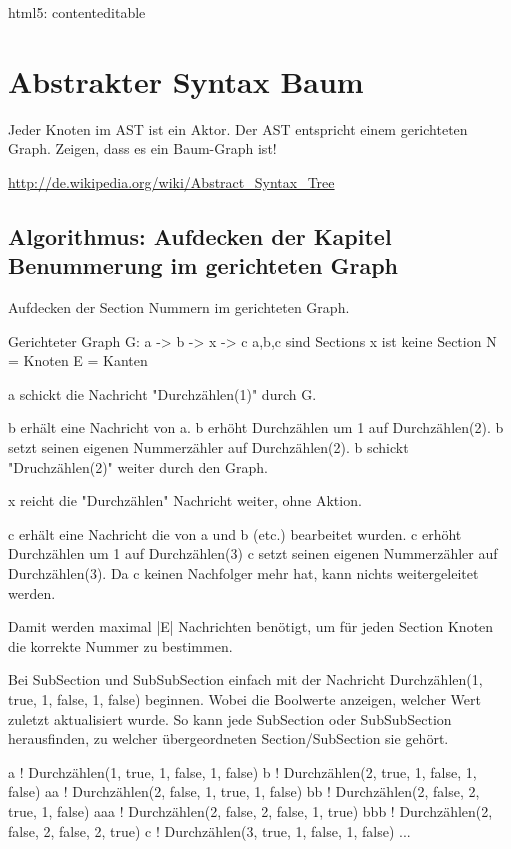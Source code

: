 html5: contenteditable


\section{Abstrakter Syntax Baum}

Jeder Knoten im AST ist ein Aktor. Der AST entspricht einem gerichteten Graph.
Zeigen, dass es ein Baum-Graph ist!

\url{http://de.wikipedia.org/wiki/Abstract_Syntax_Tree}


\subsection{Algorithmus: Aufdecken der Kapitel Benummerung im gerichteten Graph}

Aufdecken der Section Nummern im gerichteten Graph.

Gerichteter Graph G: a -> b -> x -> c
a,b,c sind Sections
x ist keine Section
N = Knoten
E = Kanten

a schickt die Nachricht "Durchzählen(1)" durch G.

b erhält eine Nachricht von a.
b erhöht Durchzählen um 1 auf Durchzählen(2).
b setzt seinen eigenen Nummerzähler auf Durchzählen(2).
b schickt "Druchzählen(2)" weiter durch den Graph.

x reicht die "Durchzählen" Nachricht weiter, ohne Aktion.

c erhält eine Nachricht die von a und b (etc.) bearbeitet wurden.
c erhöht Durchzählen um 1 auf Durchzählen(3)
c setzt seinen eigenen Nummerzähler auf Durchzählen(3).
Da c keinen Nachfolger mehr hat, kann nichts weitergeleitet werden.

Damit werden maximal |E| Nachrichten benötigt, um für jeden Section Knoten
die korrekte Nummer zu bestimmen.


Bei SubSection und SubSubSection einfach mit der
Nachricht Durchzählen(1, true, 1, false, 1, false) beginnen.
Wobei die Boolwerte anzeigen, welcher Wert zuletzt aktualisiert wurde.
So kann jede SubSection oder SubSubSection herausfinden, zu welcher
übergeordneten Section/SubSection sie gehört.

a ! Durchzählen(1, true, 1, false, 1, false)
b ! Durchzählen(2, true, 1, false, 1, false)
aa ! Durchzählen(2, false, 1, true, 1, false)
bb ! Durchzählen(2, false, 2, true, 1, false)
aaa ! Durchzählen(2, false, 2, false, 1, true)
bbb ! Durchzählen(2, false, 2, false, 2, true)
c ! Durchzählen(3, true, 1, false, 1, false)
...


